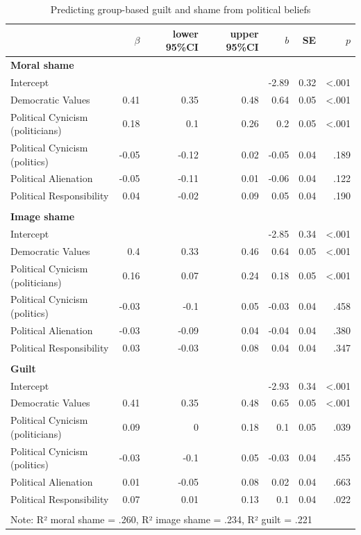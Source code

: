 \documentclass[
]{article}
\begin{document}
\begin{table}[H]
\centering
\caption{\label{tab:Table1}Predicting group-based guilt and shame from political beliefs}
\centering
\fontsize{8}{10}\selectfont
\begin{tabular}[t]{lrrrrrr}
\toprule
  & $\beta$ & lower 95\%CI & upper 95\%CI & $b$ & SE & $p$\\
\midrule
\textbf{Moral shame} & \textbf{} & \textbf{} & \textbf{} & \textbf{} & \textbf{} & \textbf{}\\
\midrule
Intercept &  &  &  & -2.89 & 0.32 & <.001\\
Democratic Values & 0.41 & 0.35 & 0.48 & 0.64 & 0.05 & <.001\\
Political Cynicism (politicians) & 0.18 & 0.1 & 0.26 & 0.2 & 0.05 & <.001\\
Political Cynicism (politics) & -0.05 & -0.12 & 0.02 & -0.05 & 0.04 & .189\\
Political Alienation & -0.05 & -0.11 & 0.01 & -0.06 & 0.04 & .122\\
Political Responsibility & 0.04 & -0.02 & 0.09 & 0.05 & 0.04 & .190\\
\midrule\\
\textbf{Image shame} & \textbf{} & \textbf{} & \textbf{} & \textbf{} & \textbf{} & \textbf{}\\
\midrule
Intercept &  &  &  & -2.85 & 0.34 & <.001\\
Democratic Values & 0.4 & 0.33 & 0.46 & 0.64 & 0.05 & <.001\\
Political Cynicism (politicians) & 0.16 & 0.07 & 0.24 & 0.18 & 0.05 & <.001\\
Political Cynicism (politics) & -0.03 & -0.1 & 0.05 & -0.03 & 0.04 & .458\\
Political Alienation & -0.03 & -0.09 & 0.04 & -0.04 & 0.04 & .380\\
Political Responsibility & 0.03 & -0.03 & 0.08 & 0.04 & 0.04 & .347\\
\midrule\\
\textbf{Guilt} & \textbf{} & \textbf{} & \textbf{} & \textbf{} & \textbf{} & \textbf{}\\
\midrule
Intercept &  &  &  & -2.93 & 0.34 & <.001\\
Democratic Values & 0.41 & 0.35 & 0.48 & 0.65 & 0.05 & <.001\\
Political Cynicism (politicians) & 0.09 & 0 & 0.18 & 0.1 & 0.05 & .039\\
Political Cynicism (politics) & -0.03 & -0.1 & 0.05 & -0.03 & 0.04 & .455\\
Political Alienation & 0.01 & -0.05 & 0.08 & 0.02 & 0.04 & .663\\
Political Responsibility & 0.07 & 0.01 & 0.13 & 0.1 & 0.04 & .022\\
\bottomrule
\multicolumn{7}{l}{\textsuperscript{} Note: R² moral shame = .260, R² image shame = .234, R² guilt = .221}\\
\end{tabular}
\end{table}
\end{document}
